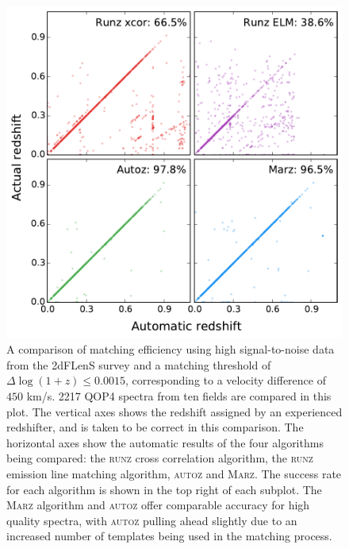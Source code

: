 \documentclass[iop]{emulateapj}
\newcommand{\runz}{\textsc{runz}}
\newcommand{\autoz}{\textsc{autoz}}
\newcommand{\marz}{\textsc{Marz}}
\begin{document}
\begin{figure}[t]
\centering
\includegraphics[width=\columnwidth]{2dfComp.pdf}
\caption{A comparison of matching efficiency using high signal-to-noise data from the 2dFLenS survey and a matching threshold of $\Delta \log(1+z) \leq 0.0015$, corresponding to a velocity difference of  $450$ km/s. 2217 QOP4 spectra from ten fields are compared in this plot. The vertical axes shows the redshift assigned by an experienced redshifter, and is taken to be correct in this comparison. The horizontal axes show the automatic results of the four algorithms being compared: the \runz{} cross correlation algorithm, the \runz{} emission line matching algorithm, \autoz{} and \marz{}. The success rate for each algorithm is shown in the top right of each subplot. The \marz{} algorithm and \autoz{} offer comparable accuracy for high quality spectra, with \autoz{} pulling ahead slightly due to an increased number of templates being used in the matching process.}
\label{fig:high}
\end{figure}
\end{document}
